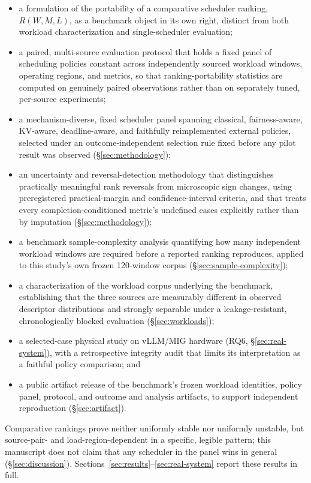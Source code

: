 \begin{itemize}
  \item a formulation of the portability of a comparative scheduler
    ranking, $R(W, M, L)$, as a benchmark object in its own right, distinct
    from both workload characterization and single-scheduler evaluation;
  \item a paired, multi-source evaluation protocol that holds a fixed
    panel of scheduling policies constant across independently sourced
    workload windows, operating regions, and metrics, so that
    ranking-portability statistics are computed on genuinely paired
    observations rather than on separately tuned, per-source experiments;
  \item a mechanism-diverse, fixed scheduler panel spanning classical,
    fairness-aware, KV-aware, deadline-aware, and faithfully reimplemented
    external policies, selected under an outcome-independent selection
    rule fixed before any pilot result was observed
    (\S\ref{sec:methodology});
  \item an uncertainty and reversal-detection methodology that
    distinguishes practically meaningful rank reversals from microscopic
    sign changes, using preregistered practical-margin and
    confidence-interval criteria, and that treats every
    completion-conditioned metric's undefined cases explicitly rather than
    by imputation (\S\ref{sec:methodology});
  \item a benchmark sample-complexity analysis quantifying how many
    independent workload windows are required before a reported ranking
    reproduces, applied to this study's own frozen 120-window corpus
    (\S\ref{sec:sample-complexity});
  \item a characterization of the workload corpus underlying the
    benchmark, establishing that the three sources are measurably
    different in observed descriptor distributions and strongly separable
    under a leakage-resistant, chronologically blocked evaluation
    (\S\ref{sec:workloads});
  \item a selected-case physical study on vLLM/MIG hardware
    (RQ6, \S\ref{sec:real-system}), with a retrospective integrity audit
    that limits its interpretation as a faithful policy comparison; and
  \item a public artifact release of the benchmark's frozen workload
    identities, policy panel, protocol, and outcome and analysis
    artifacts, to support independent reproduction (\S\ref{sec:artifact}).
\end{itemize}

Comparative rankings prove neither uniformly stable nor uniformly
unstable, but source-pair- and load-region-dependent in a specific,
legible pattern; this manuscript does not claim that any scheduler in the
panel wins in general (\S\ref{sec:discussion}). Sections~\ref{sec:results}--\ref{sec:real-system}
report these results in full.
